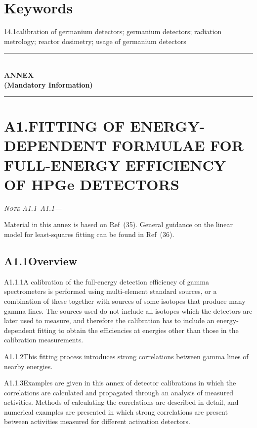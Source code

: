 \documentclass[12pt]{article}
\newenvironment{astmnote}[1][\relax]{%
  \par\smallskip\noindent\textit{N\textsc{ote}%
  \ifx#1\relax\else~#1\fi---}\ignorespaces
}{%
  \par\smallskip
}
\begin{document}
\section{Keywords}

14.1\quad calibration of germanium detectors; germanium detectors; radiation metrology;
reactor dosimetry; usage of germanium detectors

\newpage
\begin{center}
  \rule{\textwidth}{1pt}\\[0.5ex]
  {\large\bfseries ANNEX}\\[0.3ex]
  {\normalsize\bfseries (Mandatory Information)}\\[0.5ex]
  \rule{\textwidth}{1pt}
\end{center}

\section*{A1.\quad FITTING OF ENERGY-DEPENDENT FORMULAE FOR FULL-ENERGY
EFFICIENCY OF HPGe DETECTORS}

\begin{astmnote}[A1.1]
Material in this annex is based on Ref~(35). General guidance on the linear model for
least-squares fitting can be found in Ref~(36).
\end{astmnote}

\subsection*{A1.1\quad Overview}

A1.1.1\quad A calibration of the full-energy detection efficiency of gamma spectrometers
is performed using multi-element standard sources, or a combination of these together
with sources of some isotopes that produce many gamma lines. The sources used do not
include all isotopes which the detectors are later used to measure, and therefore the
calibration has to include an energy-dependent fitting to obtain the efficiencies at
energies other than those in the calibration measurements.

A1.1.2\quad This fitting process introduces strong correlations between gamma lines of
nearby energies.

A1.1.3\quad Examples are given in this annex of detector calibrations in which the
correlations are calculated and propagated through an analysis of measured activities.
Methods of calculating the correlations are described in detail, and numerical examples
are presented in which strong correlations are present between activities measured for
different activation detectors.
\end{document}
